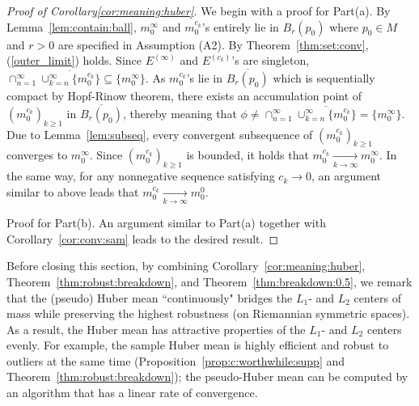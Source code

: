 \documentclass[preprint]{imsart}
\theoremstyle{plain}
\theoremstyle{remark}
\begin{document}
\begin{appendix}
\begin{proof}[Proof of Corollary\ref{cor:meaning:huber}] We begin with a proof for Part(a). By Lemma~\ref{lem:contain:ball}, $m^{\infty}_{0}$ and $m^{c_{k}}_{0}$'s entirely lie in $B_{r}(p_0)$ where $p_{0} \in M$ and $r > 0$ are specified in Assumption (A2). By Theorem~\ref{thm:set:conv}, (\ref{outer_limit}) holds. Since $E^{(\infty)}$ and $E^{(c_{k})}$'s are singleton, $\cap_{n=1}^{\infty} \overline{\cup_{k=n}^{\infty} \{m^{c_{k}}_{0} \}} \subseteq \{m^{\infty}_{0}\}$. As $m^{c_{k}}_{0}$'s lie in $\overline{B_{r}(p_0)}$ which is sequentially compact by Hopf-Rinow theorem, there exists an accumulation point of $(m^{c_{k}}_{0})_{k \ge 1}$ in $\overline{B_{r}(p_0)}$, thereby meaning that $\phi \neq \cap_{n=1}^{\infty} \overline{\cup_{k=n}^{\infty} \{m^{c_{k}}_{0} \}} = \{m^{\infty}_{0}\}$. Due to Lemma~\ref{lem:subseq}, every convergent subsequence of $(m_{0}^{c_{k}})_{k \ge 1}$ converges to $m^{\infty}_{0}$. Since $(m_{0}^{c_{k}})_{k \ge 1}$ is bounded, it holds that $m^{c_{k}}_{0} \underset{k \rightarrow \infty}{\rightarrow} m^{\infty}_{0}$. In the same way, for any nonnegative sequence satisfying $c_{k} \rightarrow 0$, an argument similar to above leads that $m^{c_{k}}_{0} \underset{k \rightarrow \infty}{\rightarrow} m^{0}_0$.


Proof for Part(b). An argument similar to Part(a) together with Corollary~\ref{cor:conv:sam} leads to the desired result. 
\end{proof}

Before closing this section, by combining Corollary~\ref{cor:meaning:huber}, Theorem~\ref{thm:robust:breakdown}, and Theorem~\ref{thm:breakdown:0.5},  we remark that the (pseudo) Huber mean ``continuously" bridges the $L_{1}$- and $L_{2}$ centers of mass while preserving the highest robustness (on Riemannian symmetric spaces). As a result, the Huber mean has attractive properties of the $L_{1}$- and $L_{2}$ centers evenly. For example, the sample Huber mean is highly efficient and robust to outliers at the same time (Proposition~\ref{prop:c:worthwhile:supp} and Theorem~\ref{thm:robust:breakdown}); the pseudo-Huber mean can be computed by an algorithm that has a linear rate of convergence.








\end{appendix}
\end{document}
